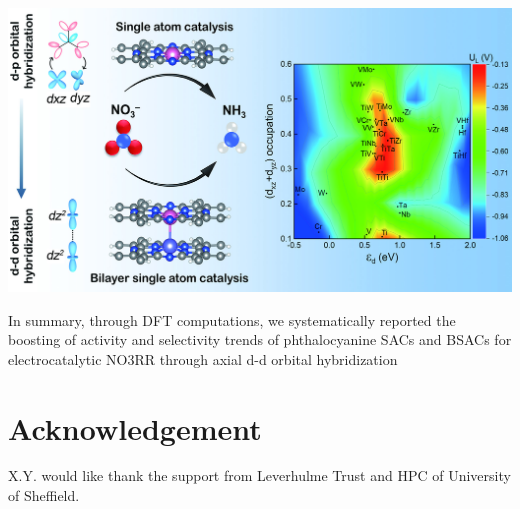 \documentclass[isoft]{ufgtexposter}
\begin{document}
\begin{poster}
 \begin{multicols}{2}

\begin{minipage}[t]{0.45\linewidth}
  \centering
  \includegraphics[scale=2]{images/TOC.jpeg}\hfill
  \end{minipage}
\columnbreak


  In summary, through DFT computations, we systematically reported the boosting of activity and selectivity trends of phthalocyanine SACs and BSACs for electrocatalytic NO3RR through axial d-d orbital hybridization
  
\end{multicols}
\vspace{0.05cm}
        \section{Acknowledgement}
    
            X.Y. would like thank the support from Leverhulme Trust and HPC of University of Sheffield.
    
        
        


    
    \end{poster}
\end{document}
